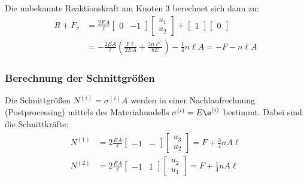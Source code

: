 \documentclass[letterpaper,10pt,german]{jupyterBook}
\begin{document}
\sphinxAtStartPar
Die unbekannte Reaktionskraft am Knoten 3 berechnet sich dann zu:
\label{equation:chapters/chapter2/1dFEM:fb70fd51-e1cc-4352-95f3-ae7efdeb6965}\begin{align}
R + F_v & = \frac{2EA}{\ell} \begin{bmatrix}
0 & -1 
\end{bmatrix} \begin{bmatrix}
u_1 \\ u_2
\end{bmatrix} + \begin{bmatrix}
1
\end{bmatrix} \begin{bmatrix}
0
\end{bmatrix} \\
&= -\frac{2EA}{\ell} \left(\frac{F\ell}{2EA} + \frac{3 n \ell^2}{8E} \right)- \frac{1}{4}n\ell A= -F - n \ell A 
\end{align}



\subsubsection{Berechnung der Schnittgrößen}
\label{\detokenize{chapters/chapter2/1dFEM:berechnung-der-schnittgroszen}}
\sphinxAtStartPar
Die Schnittgrößen \(N^{(i)}=\sigma^{(i)} A\) werden in einer Nachlaufrechnung (Postprocessing) mittels des Materialmodells \(\sigma^{(i)}=E\e^{(i)}\) bestimmt. Dabei sind die Schnittkräfte:
\begin{equation}\label{equation:chapters/chapter2/1dFEM:postproc}
\begin{split}\begin{align}
N^{(1)} & = 2\frac{EA}{\ell} \begin{bmatrix} -1 & - \end{bmatrix} \begin{bmatrix} u_3 \\ u_2 \end{bmatrix} = F + \frac{3}{4} n A \ell \\
N^{(2)} & = 2\frac{EA}{\ell} \begin{bmatrix} -1 & 1 \end{bmatrix} \begin{bmatrix} u_2 \\ u_1 \end{bmatrix}= F + \frac{1}{4} n A \ell
\end{align}\end{split}
\end{equation}
\end{document}
